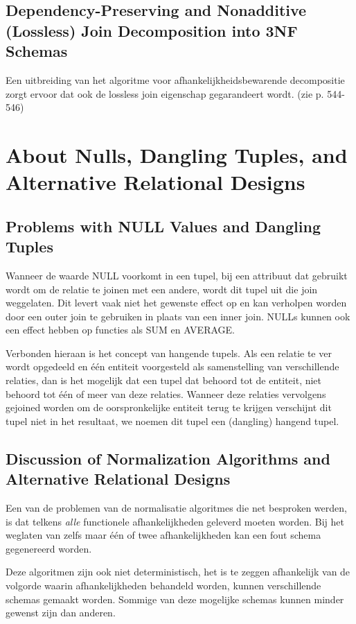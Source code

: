 				\subsection{Dependency-Preserving and Nonadditive (Lossless) Join Decomposition into 3NF Schemas}
					
					Een uitbreiding van het algoritme voor afhankelijkheidsbewarende decompositie zorgt ervoor dat ook de lossless join eigenschap gegarandeert wordt. (zie p. 544-546)
					
			\section{About Nulls, Dangling Tuples, and Alternative Relational Designs}
			
				\subsection{Problems with NULL Values and Dangling Tuples}
				
					Wanneer de waarde NULL voorkomt in een tupel, bij een attribuut dat gebruikt wordt om de relatie te joinen met een andere, wordt dit tupel uit die join weggelaten. Dit 						levert vaak niet het gewenste effect op en kan verholpen worden door een outer join te gebruiken in plaats van een inner join.	NULLs kunnen ook een effect hebben op 							functies als SUM en AVERAGE. 
					
					Verbonden hieraan is het concept van hangende tupels. Als een relatie te ver wordt opgedeeld en \'e\'en entiteit voorgesteld als samenstelling van verschillende 								relaties, dan is het mogelijk dat een tupel dat behoord tot de entiteit, niet behoord tot \'e\'en of meer van deze relaties. Wanneer deze relaties vervolgens gejoined 							worden om de oorspronkelijke entiteit terug te krijgen verschijnt dit tupel niet in het resultaat, we noemen dit tupel een (dangling) hangend tupel.
					
				\subsection{Discussion of Normalization Algorithms and Alternative Relational Designs}
				
					Een van de problemen van de normalisatie algoritmes die net besproken werden, is dat telkens \textit{alle} functionele afhankelijkheden geleverd moeten worden. Bij het 						weglaten van zelfs maar \'e\'en of twee afhankelijkheden kan een fout schema gegenereerd worden. 
					
					Deze algoritmen zijn ook niet deterministisch, het is te zeggen afhankelijk van de volgorde waarin afhankelijkheden behandeld worden, kunnen verschillende schemas 								gemaakt worden. Sommige van deze mogelijke schemas kunnen minder gewenst zijn dan anderen. 